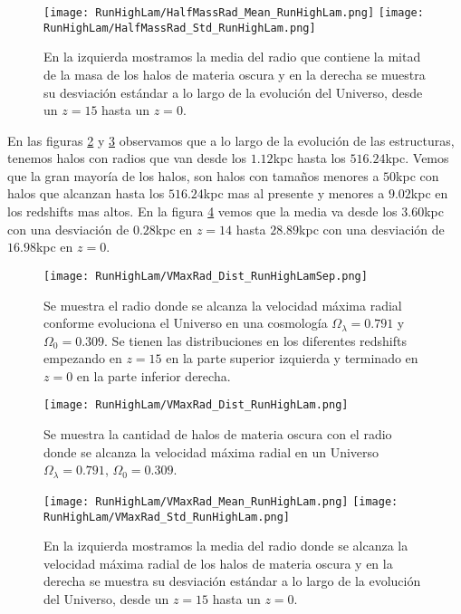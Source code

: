 \begin{figure}[H]
    \centering
    \texttt{[image: RunHighLam/HalfMassRad\_Mean\_RunHighLam.png]}
    \texttt{[image: RunHighLam/HalfMassRad\_Std\_RunHighLam.png]}
    \caption[Media y desviación estándar del radio de la mitad de la masa]{\footnotesize En la izquierda mostramos la media del radio que contiene la mitad de la masa de los halos de materia oscura y en la derecha se muestra su desviación estándar a lo largo de la evolución del Universo, desde un $z=15$ hasta un $z=0$.}
    \label{fig:HighLam-HalfMassRadStats}
\end{figure}

En las figuras \ref{fig:HighLam-VMaxRadDistSep} y \ref{fig:HighLam-VMaxRadDist} observamos que a lo largo de la evolución de las estructuras, tenemos halos con radios que van desde los $1.12$kpc hasta los $516.24$kpc. Vemos que la gran mayoría de los halos, son halos con tamaños menores a $50$kpc con halos que alcanzan hasta los $516.24$kpc mas al presente y menores a $9.02$kpc en los redshifts mas altos. En la figura \ref{fig:HighLam-VMaxRadStats} vemos que la media va desde los $3.60$kpc con una desviación de $0.28$kpc en $z=14$ hasta $28.89$kpc con una desviación de $16.98$kpc en $z=0$.

\begin{figure}[H]
    \centering
    \texttt{[image: RunHighLam/VMaxRad\_Dist\_RunHighLamSep.png]}
    \caption[Radio donde se alcanza la velocidad máxima radial]{\footnotesize Se muestra el radio donde se alcanza la velocidad máxima radial conforme evoluciona el Universo en una cosmología $\Omega_\lambda = 0.791$ y $\Omega_0 = 0.309$. Se tienen las distribuciones en los diferentes redshifts empezando en $z=15$ en la parte superior izquierda y terminado en $z=0$ en la parte inferior derecha.}
    \label{fig:HighLam-VMaxRadDistSep}
\end{figure}

\begin{figure}[H]
    \centering
    \texttt{[image: RunHighLam/VMaxRad\_Dist\_RunHighLam.png]}
    \caption[Distribución del radio donde se alcanza la velocidad máxima radial]{\footnotesize Se muestra la cantidad de halos de materia oscura con el radio donde se alcanza la velocidad máxima radial en un Universo $\Omega_\lambda = 0.791$, $\Omega_0 = 0.309$.}
    \label{fig:HighLam-VMaxRadDist}
\end{figure}

\begin{figure}[H]
    \centering
    \texttt{[image: RunHighLam/VMaxRad\_Mean\_RunHighLam.png]}
    \texttt{[image: RunHighLam/VMaxRad\_Std\_RunHighLam.png]}
    \caption[Media y desviación estándar del Radio donde se alcanza la velocidad máxima radial]{\footnotesize En la izquierda mostramos la media del radio donde se alcanza la velocidad máxima radial de los halos de materia oscura y en la derecha se muestra su desviación estándar a lo largo de la evolución del Universo, desde un $z=15$ hasta un $z=0$.}
    \label{fig:HighLam-VMaxRadStats}
\end{figure}


